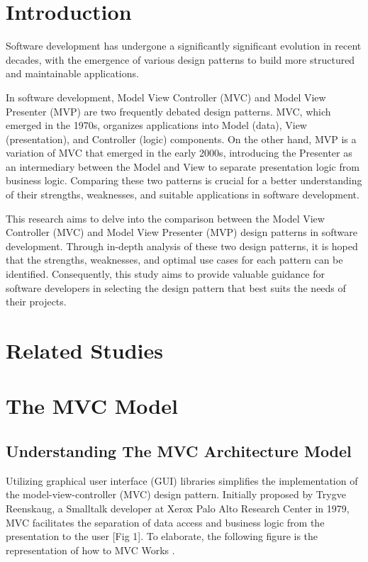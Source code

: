 \documentclass[conference]{IEEEtran}
\begin{document}
\section{Introduction}
Software development has undergone a significantly significant evolution in recent decades, with the emergence of various design patterns to build more structured and maintainable applications. 

In software development, Model View Controller (MVC) and Model View Presenter (MVP) are two frequently debated design patterns. MVC, which emerged in the 1970s, organizes applications into Model (data), View (presentation), and Controller (logic) components. On the other hand, MVP is a variation of MVC that emerged in the early 2000s, introducing the Presenter as an intermediary between the Model and View to separate presentation logic from business logic. Comparing these two patterns is crucial for a better understanding of their strengths, weaknesses, and suitable applications in software development.

This research aims to delve into the comparison between the Model View Controller (MVC) and Model View Presenter (MVP) design patterns in software development. Through in-depth analysis of these two design patterns, it is hoped that the strengths, weaknesses, and optimal use cases for each pattern can be identified. Consequently, this study aims to provide valuable guidance for software developers in selecting the design pattern that best suits the needs of their projects.

\section{Related Studies}
\section*{The MVC Model}
\subsection{Understanding The MVC Architecture Model}

Utilizing graphical user interface (GUI) libraries simplifies the implementation of the model-view-controller (MVC) design pattern. Initially proposed by Trygve Reenskaug, a Smalltalk developer at Xerox Palo Alto Research Center in 1979, MVC facilitates the separation of data access and business logic from the presentation to the user [Fig 1]. To elaborate, the following figure is the representation of how to MVC Works \cite{dey2011comparative}.
\end{document}

